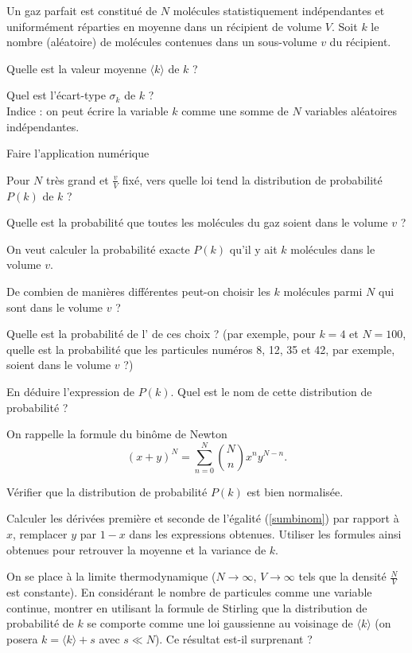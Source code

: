 Un gaz parfait est constitué de $N$ molécules statistiquement indépendantes et uniformément réparties en moyenne dans un récipient de volume $V$.  Soit $k$ le nombre (aléatoire) de molécules contenues dans un sous-volume $v$ du récipient.

\medskip

\question
Quelle est la valeur moyenne $\langle k \rangle$ de $k$ ?

\question
Quel est l'écart-type $\sigma_k$ de $k$ ? \\
Indice : on peut écrire la variable $k$ comme une somme de $N$ variables aléatoires indépendantes.
  

\question
Faire l'application numérique

\question
Pour $N$ très grand et $\frac{v}{V}$ fixé, vers quelle loi tend la distribution de probabilité $P(k)$ de $k$ ?

\question
Quelle est la probabilité que toutes les molécules du gaz soient dans le volume $v$ ?

\medskip

On veut calculer la probabilité exacte $P(k)$ qu'il y ait $k$ molécules dans le volume $v$.

\question
De combien de manières différentes peut-on choisir les $k$ molécules parmi $N$ qui sont dans le volume $v$ ?

\question
Quelle est la probabilité de l' de ces choix ? (par exemple, pour $k=4$ et $N=100$, quelle est la probabilité que les particules numéros 8, 12, 35 et 42, par exemple, soient dans le volume $v$ ?)

\question
En déduire l'expression de $P(k)$. Quel est le nom de cette distribution de probabilité ?

\medskip

On rappelle la formule du binôme de Newton
\begin{equation} 
(x+y)^N=\sum_{n=0}^N \binom Nn x^n y^{N-n}.
\label{sumbinom}
\end{equation}

\question
Vérifier que la distribution de probabilité $P(k)$ est bien normalisée.

\question
Calculer les dérivées première et seconde de l'égalité (\ref{sumbinom}) par rapport à $x$,  remplacer $y$ par $1-x$ dans les expressions obtenues. Utiliser les formules ainsi obtenues pour retrouver la moyenne et la variance de $k$.

\question
On se place à la limite thermodynamique ($N \to \infty$, $V \to \infty$ tels que la densité $\frac{N}{V}$ est constante). En considérant le nombre de particules comme une variable continue, montrer en utilisant la formule de Stirling que la distribution de probabilité de $k$ se comporte comme une loi gaussienne au voisinage de $\langle k \rangle$ (on posera $k = \langle k \rangle + s$ avec $s \ll N$). Ce résultat est-il surprenant ?

